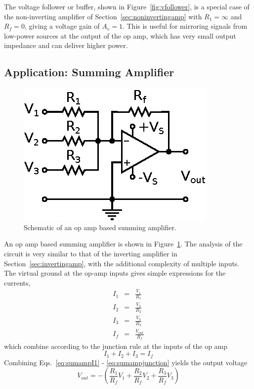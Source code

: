 \documentclass[11pt]{article}
\begin{document}
The voltage follower or buffer, shown in Figure~\ref{fig:vfollower},
is a special case of the non-inverting amplifier of
Section~\ref{sec:noninvertingamp} with $R_1 = \infty$ and $R_f = 0$,
giving a voltage gain of $A_v = 1$.  This is useful for mirroring
signals from low-power sources at the output of the op amp, which has
very small output impedance and can deliver higher power.

\subsection{Application: Summing Amplifier}
\label{sec:summingamp}

\begin{figure}[h!]
  \begin{center}
    \includegraphics{summingamp.eps}
    \caption{Schematic of an op amp based summing amplifier.}
    \label{fig:summingamp}
  \end{center}
\end{figure}

An op amp based summing amplifier is shown in
Figure~\ref{fig:summingamp}. The analysis of the circuit is very
similar to that of the inverting amplifier in
Section~\ref{sec:invertingamp}, with the additional complexity of
multiple inputs. The virtual ground at the op-amp inputs gives simple
expressions for the currents,
\begin{eqnarray}
  \label{eq:sumampI1}
  I_1 &=& \frac{V_1}{R_1}\\ I_2 &=& \frac{V_2}{R_2}\\ I_3 &=&
  \frac{V_3}{R_3}\\ I_f &=& \frac{V_{out}}{R_f}
\end{eqnarray}
which combine according to the junction rule at the inputs of the op
amp
\begin{equation}
  \label{eq:sumampjunction}
  I_1 + I_2 + I_3 = I_f
\end{equation}
Combining Eqs.~\ref{eq:sumampI1} - \ref{eq:sumampjunction} yields the
output voltage
\begin{equation}
  \label{eq:summingampvout}
  V_{out} = -\left( \frac{R_1}{R_f} V_1 + \frac{R_2}{R_f} V_2 +
  \frac{R_3}{R_f} V_3 \right)
\end{equation}
\end{document}
